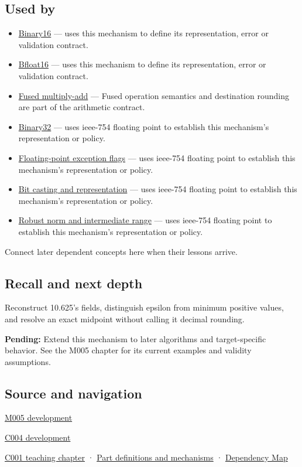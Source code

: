 \subsection{Used by}\label{appendix-343615f49ddf-used-by}

\begin{itemize}
\item
  \hyperref[appendix-34443cec7170]{Binary16} --- uses this mechanism to define its representation, error or validation contract.
\item
  \hyperref[appendix-18b8dd966b5d]{Bfloat16} --- uses this mechanism to define its representation, error or validation contract.
\item
  \hyperref[appendix-41e8ef22a21e]{Fused multiply-add} --- Fused operation semantics and destination rounding are part of the arithmetic contract.
\item
  \hyperref[appendix-5057f9ad327f]{Binary32} --- uses ieee-754 floating point to establish this mechanism's representation or policy.
\item
  \hyperref[appendix-ed8531b46754]{Floating-point exception flags} --- uses ieee-754 floating point to establish this mechanism's representation or policy.
\item
  \hyperref[appendix-34ee45f161c1]{Bit casting and representation} --- uses ieee-754 floating point to establish this mechanism's representation or policy.
\item
  \hyperref[appendix-7f1e17dcafb1]{Robust norm and intermediate range} --- uses ieee-754 floating point to establish this mechanism's representation or policy.
\end{itemize}

Connect later dependent concepts here when their lessons arrive.

\subsection{Recall and next depth}\label{appendix-343615f49ddf-recall-and-next-depth}

Reconstruct 10.625's fields, distinguish epsilon from minimum positive values, and resolve an exact midpoint without calling it decimal rounding.

\textbf{Pending:} Extend this mechanism to later algorithms and target-specific behavior. See the M005 chapter for its current examples and validity assumptions.

\subsection{Source and navigation}\label{appendix-343615f49ddf-source-and-navigation}

\hyperref[01-foundations-i-ch001-when-arithmetic-meets-uncertainty]{M005 development}

\hyperref[01-foundations-i-ch001-a-stretching-ruler-for-real-valued-quantities]{C004 development}

\hyperref[01-foundations-i-ch001-from-a-signal-to-an-interpretation]{C001 teaching chapter} · \hyperref[appendix-fd090d982a15]{Part definitions and mechanisms} · \hyperref[appendix-4ad47bdd269a]{Dependency Map}
